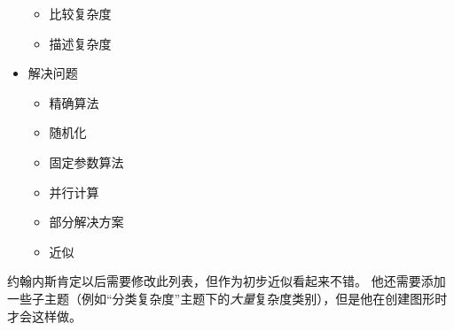 \begin{itemize}
\begin{itemize}
            \item 比较复杂度
            \item 描述复杂度
        \end{itemize}
    \item 解决问题
        \begin{itemize}\itemsep=0pt\parskip=0pt
            \item 精确算法
            \item 随机化
            \item 固定参数算法
            \item 并行计算
            \item 部分解决方案
            \item 近似
        \end{itemize}
\end{itemize}
\fi


约翰内斯肯定以后需要修改此列表，但作为初步近似看起来不错。 他还需要添加一些子主题（例如``分类复杂度''主题下的\emph {大量}复杂度类别），但是他在创建图形时才会这样做。


